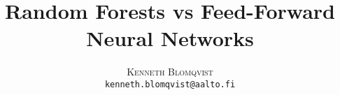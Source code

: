 \documentclass[twoside]{article}
\title{\vspace{-15mm}\fontsize{24pt}{10pt}\selectfont\textbf{Random Forests vs Feed-Forward Neural Networks}}
\author{
  \large
  \textsc{Kenneth Blomqvist}\\[2mm]
  \tt kenneth.blomqvist@aalto.fi \\[2mm]
}
\date{}
\begin{document}
\maketitle %


\begin{abstract}
  
\end{abstract}

\begin{introduction}
  
\end{introduction}

\begin{methods}
  
\end{methods}

\begin{experiments}
  
\end{experiments}


\begin{multicols}{2} %





\end{multicols} %
\pagebreak

\end{document}

